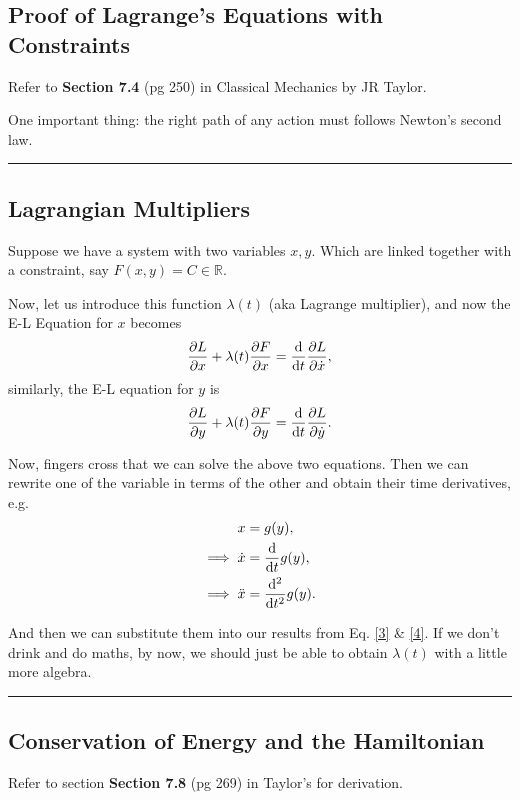 \documentclass[a4paper]{article}
\numberwithin{equation}{subsection}
\begin{document}
\subsection{Proof of Lagrange's Equations with Constraints}
Refer to \textbf{Section 7.4} (pg 250) in Classical Mechanics by JR Taylor.

One important thing: the right path of any action must follows Newton's second law.
\par\noindent\rule{\textwidth}{0.4pt}
\subsection{Lagrangian Multipliers}
Suppose we have a system with two variables $x, y$. Which are linked together with a constraint, say $F(x,y) = C \in \mathbb{R}.$ 

Now, let us introduce this function $\lambda(t)$ (aka Lagrange multiplier), and now the E-L Equation for $x$ becomes 
\begin{equation}
    \pdv{L}{x} +\lambda(t)\pdv{F}{x} = \dv{t}\pdv{L}{\dot{x}},\label{3}
\end{equation}
similarly, the E-L equation for $y$ is 
\begin{equation}
    \pdv{L}{y} +\lambda(t)\pdv{F}{y} = \dv{t}\pdv{L}{\dot{y}}.\label{4}
\end{equation}

Now, fingers cross that we can solve the above two equations. Then we can rewrite one of the variable in terms of the other and obtain their time derivatives, e.g.
\begin{align}
    x &= g(y),\\
    \implies \dot{x} &= \dv{t}g(y),\\
    \implies \ddot{x} &= \dv[2]{t}g(y).
\end{align}

And then we can substitute them into our results from Eq. \eqref{3} \& \eqref{4}. If we don't drink and do maths, by now, we should just be able to obtain $\lambda(t)$ with a little more algebra.






\par\noindent\rule{\textwidth}{0.4pt}
\subsection{Conservation of Energy and the Hamiltonian}
Refer to section \textbf{Section 7.8} (pg 269) in Taylor's for derivation.
\end{document}

